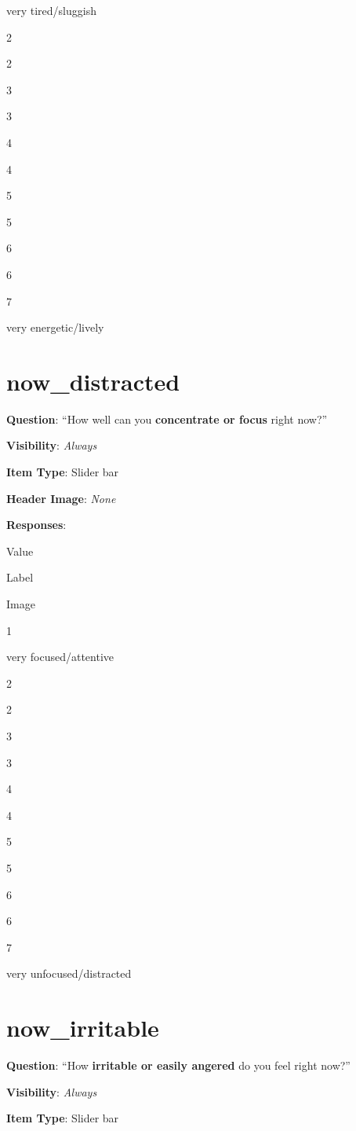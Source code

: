 \documentclass[]{book}
\begin{document}
very tired/sluggish

2

2

3

3

4

4

5

5

6

6

7

very energetic/lively

\hypertarget{now_distracted}{%
\section{now\_distracted}\label{now_distracted}}

\textbf{Question}: ``How well can you \textbf{concentrate or focus} right now?''

\textbf{Visibility}: \emph{Always}

\textbf{Item Type}: Slider bar

\textbf{Header Image}: \emph{None}

\textbf{Responses}:

Value

Label

Image

1

very focused/attentive

2

2

3

3

4

4

5

5

6

6

7

very unfocused/distracted

\hypertarget{now_irritable}{%
\section{now\_irritable}\label{now_irritable}}

\textbf{Question}: ``How \textbf{irritable or easily angered} do you feel right now?''

\textbf{Visibility}: \emph{Always}

\textbf{Item Type}: Slider bar
\end{document}
